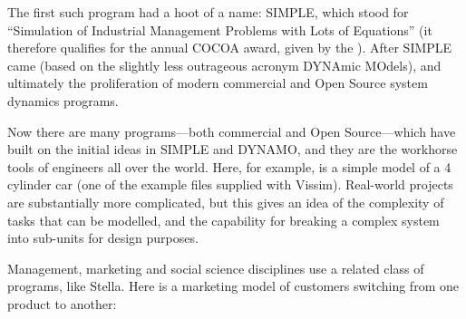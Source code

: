 The first such program had a hoot of a name: SIMPLE, which stood for
“Simulation of Industrial Management Problems with Lots of Equations”
(it therefore qualifies for the annual COCOA award, given by the
). After
SIMPLE came
(based on the slightly less outrageous acronym DYNAmic MOdels), and
ultimately the proliferation of modern commercial and Open Source
system dynamics programs. 

Now there are many programs---both commercial and Open Source---which
have built on the initial ideas in SIMPLE and DYNAMO, and they are the
workhorse tools of engineers all over the world. Here, for example, is
a simple model of a 4 cylinder car (one of the example files supplied
with Vissim). Real-world projects are substantially more complicated,
but this gives an idea of the complexity of tasks that can be
modelled, and the capability for breaking a complex system into
sub-units for design purposes. 


Management, marketing and social science disciplines use a related
class of programs, like Stella. Here is a marketing model of customers
switching from one product to another: 



